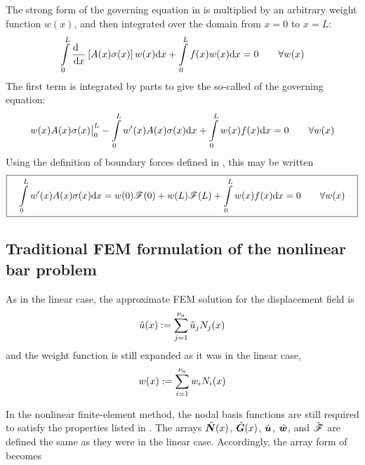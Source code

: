 The strong form of the governing equation in  is multiplied by an arbitrary weight function  $w(x)$, and then integrated over the domain from $x=0$ to $x=L$:
\begin{equation}
  \int\limits_0^L \frac{\mathrm{d}~~}{\mathrm{d} x}\left[A(x) {\sigma}(x)\right] w(x)\mathrm{d} x  +  \int\limits_0^L f(x)w(x)\mathrm{d} x=0
\qquad\forall w(x)
\end{equation}
The first term is integrated by parts to give the so-called  of the governing equation:
\begin{equation}
  w(x) A(x) {\sigma}(x) \big|_0^L-\int\limits_0^L w'(x) A(x) {\sigma}(x)\mathrm{d} x  +  \int\limits_0^L w(x)f(x)\mathrm{d} x=0
\qquad\forall w(x)
\label{eq:nonLinearBarWeakForm}
\end{equation}
Using the definition of boundary forces defined in , this may be written
\begin{equation}
\boxed{\quad
 \int\limits_0^L w'(x)A(x) {\sigma}(x) \mathrm{d} x = w(0)\mathscr{F}(0)+w(L)\mathscr{F}(L)  +  \int\limits_0^L w(x)f(x)\mathrm{d} x=0
\qquad\forall w(x)
\quad}
\label{eq:nonLinearBarWeakFormWithForcesc}
\end{equation}




\subsection{Traditional FEM formulation of the nonlinear bar problem}
\label{sec:nonLinearBarFEM}
As in the linear case, the approximate FEM solution for the displacement field is
\begin{equation}
  \tilde{u}(x):=\sum\limits_{j=1}^{{\nu_\text{n}}}\tilde{u}_j {N}_j(x)
\label{eq:nonLinaprxuc}
\end{equation}
and the weight function is still expanded as it was in the linear case,
\begin{equation}
  w(x):=\sum\limits_{i=1}^{{\nu_\text{n}}}w_i {N}_i(x)
\label{eq:nonLinweightc}
\end{equation}

In the nonlinear finite-element method, the nodal basis functions are still required to satisfy the properties listed in . The arrays $\hat{\bm{N}}(x)$, $\hat{\bm{G}}(x)$, $\hat{\bm{u}}$, $\hat{\bm{w}}$, and $\hat{\bm{\mathscr{F}}}$ are defined the same as they were in the linear case. Accordingly, the array form of  becomes

